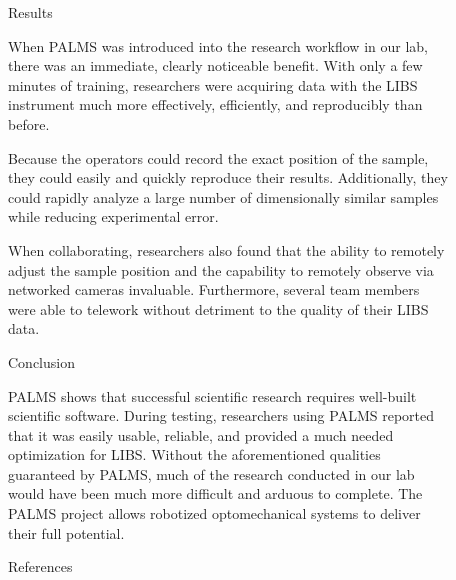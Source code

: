 \documentclass[final]{beamer}
\newlength{\sepwidth}
\newlength{\colwidth}
\newcommand{\separatorcolumn}{\begin{column}{\sepwidth}\end{column}}
\begin{document}
\begin{frame}[t]
\begin{columns}[t]
\begin{column}{\colwidth}
\end{column}

\separatorcolumn

\begin{column}{\colwidth}

  \begin{block}{Results}

    When PALMS was introduced into the research workflow in our lab, there was an immediate, clearly noticeable benefit.
    With only a few minutes of training, researchers were acquiring data with the LIBS instrument much more 
    effectively, efficiently, and reproducibly than before.
    
    Because the operators could record the exact position of the sample, they could easily and quickly reproduce their results.
    Additionally, they could rapidly analyze a large number of dimensionally similar samples while reducing experimental error.

    When collaborating, researchers also found that the ability to remotely adjust the sample position 
    and the capability to remotely observe via networked cameras invaluable.
    Furthermore, several team members were able to telework without detriment to the quality of their LIBS data.

  \end{block}

  \begin{block}{Conclusion}

    PALMS shows that successful scientific research requires well-built scientific software.
    During testing, researchers using PALMS reported that it was 
    easily usable, 
    reliable, 
    and provided a much needed optimization for LIBS.
    Without the aforementioned qualities guaranteed by PALMS, 
    much of the research conducted in our lab would have been much more difficult and arduous to complete.
    The PALMS project allows robotized optomechanical systems to deliver their full potential.

  \end{block}

  \begin{block}{References}

    \nocite{*}
    \footnotesize{}

  \end{block}

\end{column}

\separatorcolumn
\end{columns}
\end{frame}
\end{document}
